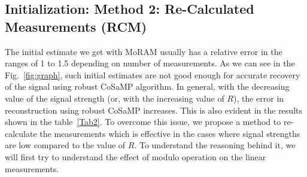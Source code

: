 \subsection{Initialization: Method 2: Re-Calculated Measurements (RCM)}
The initial estimate we get with MoRAM usually has a relative error in the ranges of 1 to 1.5 depending on number of measurements. As we can see in the Fig.~\ref{fig:graph}, such initial estimates are not good enough for accurate recovery of the signal using robust CoSaMP algorithm. In general, with the decreasing value of the signal strength (or, with the increasing value of $R$), the error in reconstruction using robust CoSaMP increases. This is also evident in the results shown in the table~\ref{Tab2}. To overcome this issue, we propose a method to re-calculate the measurements which is effective in the cases where signal strengths are low compared to the value of $R$. To understand the reasoning behind it, we will first try to understand the effect of modulo operation on the linear measurements.

